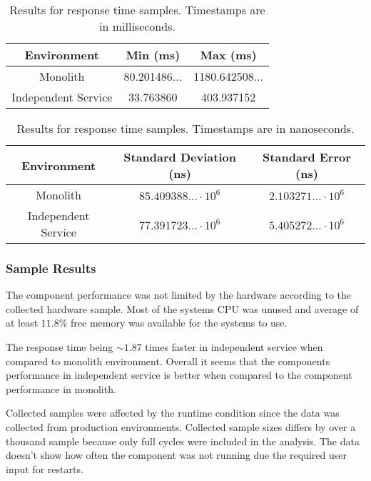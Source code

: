 \begin{table}[ht!]
    \begin{tabular}{|c|c|c|} 
        \hline
        Environment
        & Min (ms)
        & Max (ms) \\ [0.5ex] 
        
        \hline\hline
        Monolith
        & 80.201486... 
        & 1180.642508...
        \\ 
        
        Independent Service
        & 33.763860
        & 403.937152
        \\
        \hline
    \end{tabular}
    \caption{Results for response time samples. Timestamps are in milliseconds.}
    \label{table:response time results:2}
\end{table}

\begin{table}[ht!]
    \begin{tabular}{|c|c|c|} 
        \hline
        Environment
        & Standard Deviation (ns)
        & Standard Error (ns) \\ [0.5ex] 
        
        \hline\hline
        Monolith
        & $85.409388... \cdot 10^6$
        & $2.103271... \cdot 10^6$
        \\ 
        
        Independent Service
        & $77.391723... \cdot 10^6$
        & $5.405272... \cdot 10^6$
        \\ 
         \hline
    \end{tabular}
    \caption{Results for response time samples. Timestamps are in nanoseconds.}
    \label{table:response time results:3}
\end{table}

\subsubsection{Sample Results}
The component performance was not limited by the hardware according to the collected hardware sample.
Most of the systems CPU was unused and average of at least $11.8\%$ free memory was available for the systems to use.

The response time being $\sim 1.87$ times faster in independent service when compared to monolith environment.
Overall it seems that the components performance in independent service is better when compared to the component performance in monolith.

Collected samples were affected by the runtime condition since the data was collected from production environments.
Collected sample sizes differs by over a thousand sample because only full cycles were included in the analysis.
The data doesn't show how often the component was not running due the required user input for restarts.
